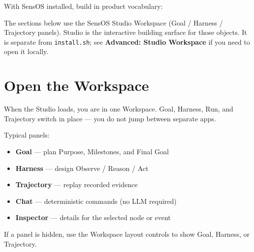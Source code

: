 \documentclass[11pt,a4paper,oneside]{article}
\newcommand{\pathcode}[1]{\texttt{#1}}
\begin{document}
With SensOS installed, build in product vocabulary:

\begin{center}
\end{center}

The sections below use the SensOS Studio Workspace (Goal / Harness / Trajectory panels). Studio is the interactive building surface for those objects. It is separate from \pathcode{install.sh}; see \textbf{Advanced: Studio Workspace} if you need to open it locally.

\section{Open the Workspace}
\label{sec:workspace}

When the Studio loads, you are in one Workspace. Goal, Harness, Run, and Trajectory switch in place — you do not jump between separate apps.

Typical panels:

\begin{itemize}
  \item \textbf{Goal} — plan Purpose, Milestones, and Final Goal
  \item \textbf{Harness} — design Observe / Reason / Act
  \item \textbf{Trajectory} — replay recorded evidence
  \item \textbf{Chat} — deterministic commands (no LLM required)
  \item \textbf{Inspector} — details for the selected node or event
\end{itemize}

If a panel is hidden, use the Workspace layout controls to show Goal, Harness, or Trajectory.

\end{document}
